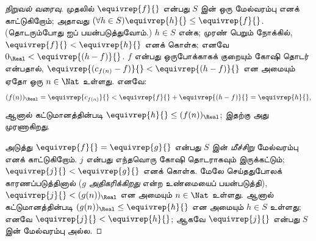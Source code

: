 \documentclass[../../../include/open-logic-section]{subfiles}
\begin{document}
\begin{proof}[நிறுவல் வரைவு]
முதலில் $\equivrep{f}{}$ என்பது $S$ இன் ஒரு மேல்வரம்பு எனக் காட்டுகிறோம்;
அதாவது $(\forall h \in S)\equivrep{h}{} \leq \equivrep{f}{}$.
(தொடரும்போது  ஐப் பயன்படுத்துவோம்.)
$h \in S$ என்க; முரண் பெறும் நோக்கில்,
$\equivrep{f}{} < \equivrep{h}{}$ எனக் கொள்க;
எனவே $0_\Real < \equivrep{(h-f)}{}$.
$f$ என்பது ஒருபோக்காகக் குறையும் கோஷி தொடர் என்பதால்,
$\equivrep{(c_{f(n)} - f)}{} < \equivrep{(h-f)}{}$ என அமையும்
ஏதோ ஒரு $n \in \Nat$ உள்ளது. எனவே:
\[
	(f(n))_\Real = \equivrep{c_{f(n)}}{} < \equivrep{f}{} + \equivrep{(h-f)}{} = \equivrep{h}{},
\]
ஆனால் கட்டுமானத்தின்படி $\equivrep{h}{} \leq (f(n))_\Real$;
இதற்கு அது முரணாகிறது.

அடுத்து $\equivrep{f}{} = \equivrep{g}{}$ என்பது $S$ இன்
\emph{மீச்சிறு} மேல்வரம்பு எனக் காட்டுகிறோம்.
$j$ என்பது எந்தவொரு கோஷி தொடராகவும் இருக்கட்டும்;
$\equivrep{j}{} < \equivrep{g}{}$ எனக் கொள்க.
மேலே செய்ததுபோலக் காரணப்படுத்தினால் ($g$ \emph{அதிகரிக்கிறது}
என்ற உண்மையைப் பயன்படுத்தி),
$\equivrep{j}{} < (g(n))_\Real$ என அமையும் $n \in \Nat$ உள்ளது.
ஆனால் கட்டுமானத்தின்படி $(g(n))_\Real \leq \equivrep{h}{}$ என
அமையும் $h \in S$ உள்ளது; எனவே $\equivrep{j}{} < \equivrep{h}{}$;
ஆகவே $\equivrep{j}{}$ என்பது $S$ இன் மேல்வரம்பு அல்ல.
\end{proof}
\end{document}
